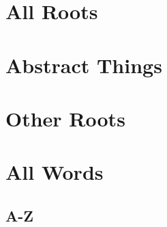 \ifdefined\printvocabulary

\part{All Roots}









\part{Abstract Things}









\part{Other Roots}


\part{All Words}



\chapter{A-Z}
































\fi